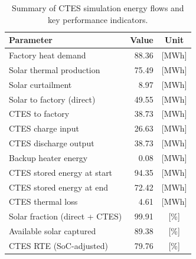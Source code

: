 \renewcommand{\arraystretch}{1.2}
\begin{table}[h]
\centering
\begin{tabular}{l|r c}
\hline
Parameter & Value & Unit \\
\hline
Factory heat demand & 88.36 & [MWh] \\
Solar thermal production & 75.49 & [MWh] \\
Solar curtailment & 8.97 & [MWh] \\
Solar to factory (direct) & 49.55 & [MWh] \\
CTES to factory & 38.73 & [MWh] \\
CTES charge input & 26.63 & [MWh] \\
CTES discharge output & 38.73 & [MWh] \\
Backup heater energy & 0.08 & [MWh] \\
CTES stored energy at start & 94.35 & [MWh] \\
CTES stored energy at end & 72.42 & [MWh] \\
CTES thermal loss & 4.61 & [MWh] \\
\hline
Solar fraction (direct + CTES) & 99.91 & [\%] \\
Available solar captured & 89.38 & [\%] \\
CTES RTE (SoC-adjusted) & 79.76 & [\%] \\
\hline
\end{tabular}
\caption{Summary of CTES simulation energy flows and key performance indicators.}
\label{tab:ctes-simulation-summary}
\end{table}
